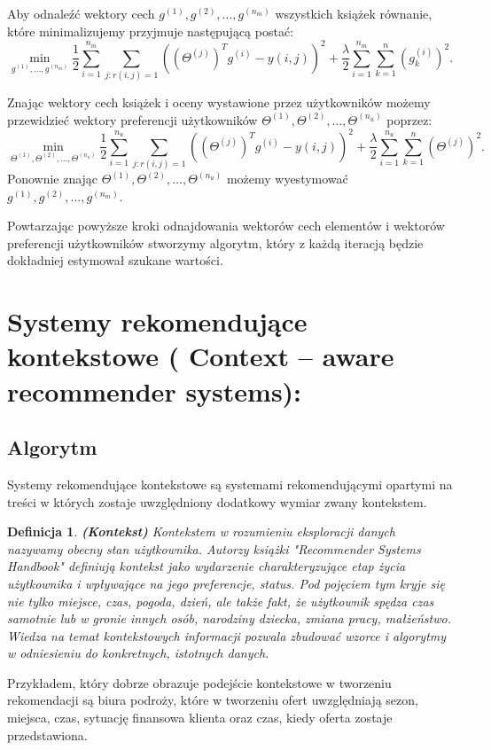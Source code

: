 \documentclass[12pt,a4paper]{report}
\newtheorem{df}{Definicja}[chapter]
\begin{document}
Aby odnaleźć wektory cech $g^{(1)}, g^{(2)},...,g^{(n_m)}$ wszystkich książek równanie, które minimalizujemy przyjmuje następującą postać:
$$\min \limits_{g^{(1)},...,g^{(n_m)}} \frac{1}{2} \sum_{i=1}^{n_m} \sum_{j:r(i,j)=1} ((\Theta^{(j)})^T g^{(i)} - y(i,j))^2 + \frac{\lambda}{2} \sum_{i=1}^{n_m} \sum_{k=1}^n (g_k^{(i)})^2.$$

Znając wektory cech książek i oceny wystawione przez użytkowników możemy przewidzieć wektory preferencji użytkowników $\Theta^{(1)}, \Theta^{(2)},...,\Theta^{(n_u)}$ poprzez:
$$\min \limits_{\Theta^{(1)}, \Theta^{(2)},...,\Theta^{(n_u)}} \frac{1}{2} \sum_{i=1}^{n_u} \sum_{j:r(i,j)=1} ((\Theta^{(j)})^T g^{(i)} - y(i,j))^2 + \frac{\lambda}{2} \sum_{i=1}^{n_u} \sum_{k=1}^n (\Theta^{(j)})^2.$$
Ponownie znając $\Theta^{(1)}, \Theta^{(2)},...,\Theta^{(n_u)}$ możemy wyestymować $g^{(1)}, g^{(2)},...,g^{(n_m)}$.

Powtarzając powyższe kroki odnajdowania wektorów cech elementów i wektorów preferencji użytkowników stworzymy algorytm, który z każdą iteracją będzie dokładniej estymował szukane wartości.
\section{Systemy rekomendujące kontekstowe ( Context – aware recommender systems):}

\subsection{Algorytm}
Systemy rekomendujące kontekstowe są systemami rekomendującymi opartymi na treści w których zostaje uwzględniony dodatkowy wymiar zwany kontekstem.

\begin{df}\textbf{(Kontekst)}
Kontekstem w rozumieniu eksploracji danych nazywamy obecny stan użytkownika. Autorzy książki "Recommender Systems Handbook" definiują kontekst jako wydarzenie charakteryzujące etap życia użytkownika i wpływające na jego preferencje, status. Pod pojęciem tym kryje się nie tylko miejsce, czas, pogoda, dzień, ale także fakt, że użytkownik spędza czas samotnie lub w gronie innych osób, narodziny dziecka, zmiana pracy, małżeństwo. Wiedza na temat kontekstowych informacji pozwala zbudować wzorce i algorytmy w odniesieniu do konkretnych, istotnych danych.
\end{df}
Przykładem, który dobrze obrazuje podejście kontekstowe w tworzeniu rekomendacji są biura podroży, które w tworzeniu ofert uwzględniają sezon, miejsca, czas, sytuację finansowa klienta oraz czas, kiedy oferta zostaje przedstawiona. 
\end{document}
